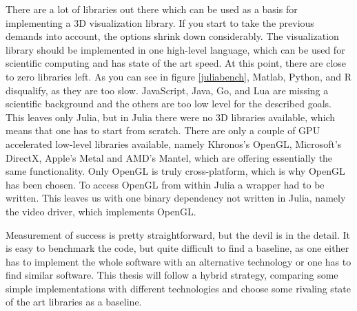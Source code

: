 There are a lot of libraries out there which can be used as a basis for implementing a 3D visualization library.
If you start to take the previous demands into account, the options shrink down considerably.
The visualization library should be implemented in one high-level language, which can be used for scientific computing and has state of the art speed. 
At this point, there are close to zero libraries left. As you can see in figure \cref{juliabench}, Matlab, Python, and R disqualify, as they are too slow. JavaScript, Java, Go, and Lua are missing a scientific background and the others are too low level for the described goals.
This leaves only Julia, but in Julia there were no 3D libraries available, which means that one has to start from scratch.
There are only a couple of GPU accelerated low-level libraries available, namely Khronos's \ac{OpenGL}, Microsoft's DirectX, Apple's Metal and AMD's Mantel, which are offering essentially the same functionality. 
Only \ac{OpenGL} is truly cross-platform, which is why \ac{OpenGL} has been chosen.
To access \ac{OpenGL} from within Julia a wrapper had to be written. 
This leaves us with one binary dependency not written in Julia, namely the video driver, which implements \ac{OpenGL}.

Measurement of success is pretty straightforward, but the devil is in the detail.
It is easy to benchmark the code, but quite difficult to find a baseline, as one either has to implement the whole software with an alternative technology or one has to find similar software.
This thesis will follow a hybrid strategy, comparing some simple implementations with different technologies and choose some rivaling state of the art libraries as a baseline.

